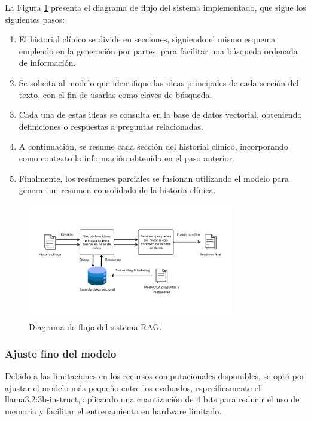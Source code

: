 \documentclass[../main.tex]{subfiles}
\begin{document}
La Figura \ref{fig:diagrama_rag} presenta el diagrama de flujo del sistema implementado, que sigue los siguientes pasos:

\begin{enumerate}
	\item El historial clínico se divide en secciones, siguiendo el mismo esquema empleado en la generación por partes, para facilitar una búsqueda ordenada de información.
	\item Se solicita al modelo que identifique las ideas principales de cada sección del texto, con el fin de usarlas como claves de búsqueda.
	\item Cada una de estas ideas se consulta en la base de datos vectorial, obteniendo definiciones o respuestas a preguntas relacionadas.
	\item A continuación, se resume cada sección del historial clínico, incorporando como contexto la información obtenida en el paso anterior.
	\item Finalmente, los resúmenes parciales se fusionan utilizando el modelo para generar un resumen consolidado de la historia clínica.
\end{enumerate}

\begin{figure}[H]
	\centering
	\includegraphics[width=0.8\textwidth]{images/diagrama-flujo-rag.png}
	\caption{Diagrama de flujo del sistema RAG.}
	\label{fig:diagrama_rag}
\end{figure}
\subsubsection{Ajuste fino del modelo}

Debido a las limitaciones en los recursos computacionales disponibles, se optó por ajustar el modelo más pequeño entre los evaluados, específicamente el llama3.2:3b-instruct, aplicando una cuantización de 4 bits para reducir el uso de memoria y facilitar el entrenamiento en hardware limitado.
\end{document}
